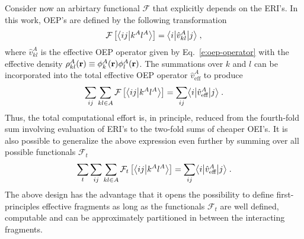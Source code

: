 Consider now an arbirtary functional $\mathcal{F}$ that explicitly depends on the 
ERI's. In this work, OEP's are defined by the following transformation
%
 \begin{equation}
 \mathcal{F}
 \left[ 
   \bigl\langle {ij} \bigl\lvert {k^Al^A} \bigr\rangle
	 \right] = \bigl\langle {i} \bigl\lvert {\hat{v}_{kl}^A} \bigl\lvert {j} \bigr\rangle  \;,
 \end{equation}
%
where 
$\hat{v}_{kl}^A$ is the effective OEP operator given by Eq.~\eqref{e:oep-operator} 
with the
effective density $\rho_{kl}^A({\bf r}) \equiv \phi_k^A({\bf r})\phi_l^A({\bf r})$.
The summations over $k$ and $l$ can be incorporated into the total effective OEP operator
$\hat{v}_{\text{eff}}^A$
to produce
%
\begin{equation}
	\sum_{ij}\sum_{kl\in A} \mathcal{F}\left[ 
   \bigl\langle {ij} \bigl\lvert {k^Al^A} \bigr\rangle
 \right] = \sum_{ij} \bigl\langle {i} \bigl\lvert {\hat{v}_{\text{eff}}^A} \bigl\lvert {j} \bigr\rangle  \;.
\end{equation}
%
Thus, the total computational effort is, in principle, reduced from the fourth\hyp{}fold
sum involving evaluation of ERI's to the two\hyp{}fold sums of cheaper OEI's.
It is also possible to generalize the above expression even further by
summing over all possible functionals ${\mathcal{F}}_t$
%
\begin{equation} \label{e:ft-reduction}
	\sum_t \sum_{ij}\sum_{kl\in A} {\mathcal{F}}_t\left[ 
   \bigl\langle {ij} \bigl\lvert {k^Al^A} \bigr\rangle
 \right] = \sum_{ij} \bigl\langle {i} \bigl\lvert {\hat{v}_{\text{eff}}^A} \bigl\lvert {j} \bigr\rangle \;.
\end{equation}
%
The above design has the advantage that it opens the possibility to define first\hyp{}principles
effective fragments as long as 
the functionals ${\mathcal{F}}_t$ 
are well defined, computable and can be approximately
partitioned in between the interacting fragments.

